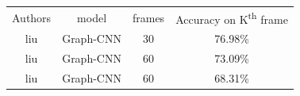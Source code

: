 \documentclass[11pt]{article}
\begin{document}
\begin{center}
\begin{tabular}{| c c c c |}\hline
    Authors           & model & frames & Accuracy on K\textsuperscript{th} frame\\
     liu\cite{liu2020spatiotemporal} & Graph-CNN & 30 & 76.98\% \\
     liu\cite{liu2020spatiotemporal} & Graph-CNN & 60 & 73.09\% \\
     liu\cite{liu2020spatiotemporal} & Graph-CNN & 60 & 68.31\% \\%



\end{tabular}
\end{center}




\end{document}
